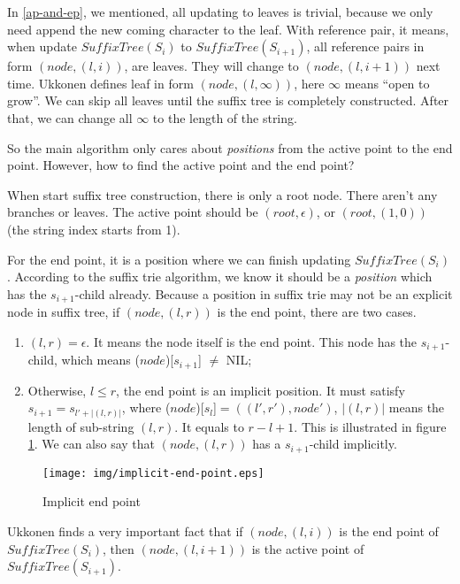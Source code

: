 \documentclass[UTF8]{article}
\begin{document}
In \ref{ap-and-ep}, we mentioned, all updating to leaves is trivial, because we
only need append the new coming character to the leaf. With reference pair,
it means, when update $SuffixTree(S_i)$ to $SuffixTree(S_{i+1})$,
all reference pairs in form $(node, (l, i))$, are leaves. They will
change to $(node, (l, i+1))$ next time. Ukkonen defines leaf in form
$(node, (l, \infty))$, here $\infty$ means ``open to grow''. We can skip all
leaves until the suffix tree is completely constructed. After that, we can
change all $\infty$ to the length of the string.

So the main algorithm only cares about {\em positions} from the active point
to the end point. However, how to find the active point and the end point?

When start suffix tree construction, there is only a root node. There aren't
any branches or leaves. The active point should be $(root, \epsilon)$, or
$(root, (1, 0))$ (the string index starts from 1).

For the end point, it is a position where we can finish updating $SuffixTree(S_i)$.
According to the suffix trie algorithm, we know it should be a
{\em position} which has the $s_{i+1}$-child already. Because a position
in suffix trie may not be an explicit node in suffix tree, if $(node, (l, r))$
is the end point, there are two cases.

\begin{enumerate}
\item $(l, r)=\epsilon$. It means the node itself is the end point. This node has the
$s_{i+1}$-child, which means ($node$)[$s_{i+1}$] $\neq$ NIL;
\item Otherwise, $l \leq r$, the end point is an implicit position.
It must satisfy $s_{i+1}=s_{l'+|(l, r)|}$, where
($node$)[$s_l$]$=((l', r'), node')$, $|(l, r)|$ means
the length of sub-string $(l, r)$. It equals to $r-l+1$.
This is illustrated in figure \ref{fig:implicit-end-point}. We can
also say that $(node, (l, r))$ has a $s_{i+1}$-child implicitly.
\end{enumerate}

\begin{figure}[htbp]
  \centering
  \texttt{[image: img/implicit-end-point.eps]}
  \caption{Implicit end point}
  \label{fig:implicit-end-point}
\end{figure}

Ukkonen finds a very important fact that if $(node, (l, i))$ is the end
point of $SuffixTree(S_i)$, then $(node, (l, i+1))$ is the active point of
$SuffixTree(S_{i+1})$.
\end{document}
